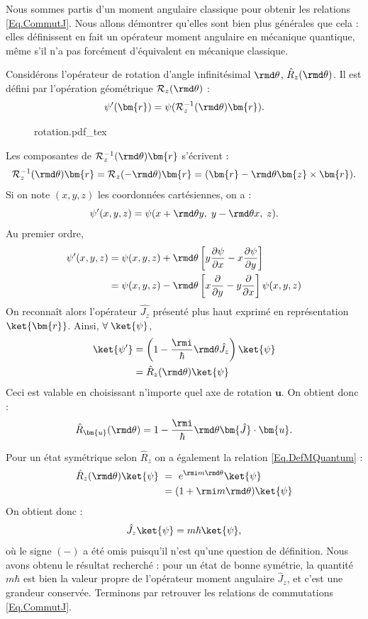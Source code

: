Nous sommes partis d'un moment angulaire classique pour obtenir les relations \ref{Eq.CommutJ}. Nous allons démontrer qu'elles sont bien plus générales que cela : elles définissent en fait un opérateur moment angulaire en mécanique quantique, même s'il n'a pas forcément d'équivalent en mécanique classique. 

Considérons l'opérateur de rotation d'angle infinitésimal $\rmd\theta$, $\hat{R}_z(\rmd\theta)$. Il est défini par l'opération géométrique $\mathcal{R}_z(\rmd\theta)$ :
\[\psi'(\bm{r}) = \psi(\mathcal{R}_z^{-1}(\rmd\theta)\bm{r}).\]

\begin{figure}[!ht]
\centering
\def\svgwidth{0.6\columnwidth}
{rotation.pdf_tex}
\label{Fig:Rotation}
\end{figure}

Les composantes de $\mathcal{R}_z^{-1}(\rmd\theta)\bm{r}$ s'écrivent :
\[\mathcal{R}_z^{-1}(\rmd\theta)\bm{r} = \mathcal{R}_z(-\rmd\theta)\bm{r} = (\bm{r}-\rmd\theta\bm{z}\times\bm{r}).\]
Si on note $(x,y,z)$ les coordonnées cartésiennes, on a :
\[\psi'(x,y,z) = \psi(x+\rmd\theta y,\;y-\rmd\theta x,\;z).\]
Au premier ordre,
\begin{align*}
\psi'(x,y,z) &= \psi(x,y,z)+\rmd\theta\left[y\frac{\partial\psi}{\partial x}-x\frac{\partial\psi}{\partial y}\right]\\
&= \psi(x,y,z)-\rmd\theta\left[x\frac{\partial}{\partial y}-y\frac{\partial}{\partial x}\right]\psi(x,y,z)
\end{align*}
On reconnaît alors l'opérateur $\hat{J_z}$ présenté plus haut exprimé en représentation $\ket{\bm{r}}$. Ainsi, $\forall\;\ket{\psi}$,
\begin{align*}
\ket{\psi'}&=\left(1-\frac{\rmi}{\hbar}\rmd\theta\hat{J_z}\right)\ket{\psi}\\
&=\hat{R}_z(\rmd\theta)\ket{\psi}
\end{align*}
Ceci est valable en choisissant n'importe quel axe de rotation $\bm{u}$. On obtient donc :
\begin{equation}
\hat{R}_{\bm{u}}(\rmd\theta) = 1-\frac{\rmi}{\hbar}\rmd\theta\bm{\hat{J}}\cdot\bm{u}.
\label{eq:qmrot1}
\end{equation}

Pour un état symétrique selon $\hat{R}_z$ on a également la relation \ref{Eq.DefMQuantum} :
\begin{align*}
\hat{R}_z(\rmd\theta)\ket{\psi}~&=~e^{\rmi m\rmd\theta}\ket{\psi}\\
~&=(1+\rmi m\rmd\theta)\ket{\psi}
\end{align*}
On obtient donc : 
\begin{equation*}
\hat{J}_z\ket{\psi} = m\hbar\ket{\psi},
\end{equation*}
où le signe $(-)$ a été omis puisqu'il n'est qu'une question de définition. Nous avons obtenu le résultat recherché : pour un état de bonne symétrie, la quantité $m\hbar$ est bien la valeur propre de l'opérateur moment angulaire $\hat{J}_z$, et c'est une grandeur conservée. Terminons par retrouver les relations de commutations \ref{Eq.CommutJ}.

